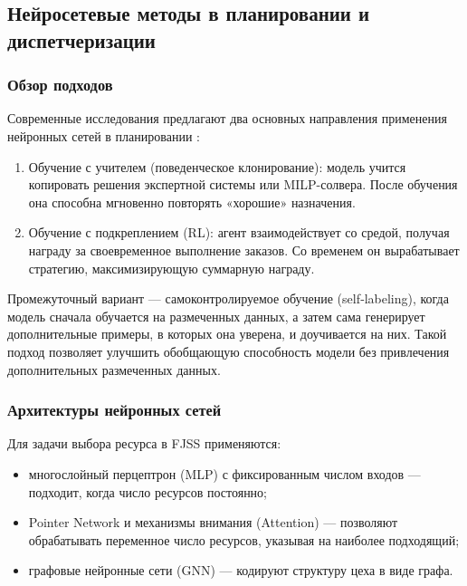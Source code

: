 \subsection{Нейросетевые методы в планировании и диспетчеризации}

\subsubsection{Обзор подходов}

Современные исследования предлагают два основных направления применения нейронных сетей в планировании \cite{gvoz}:

\begin{enumerate}
    \item Обучение с учителем (поведенческое клонирование): модель учится копировать решения экспертной системы или MILP-солвера. После обучения она способна мгновенно повторять «хорошие» назначения.
    \item Обучение с подкреплением (RL): агент взаимодействует со средой, получая награду за своевременное выполнение заказов. Со временем он вырабатывает стратегию, максимизирующую суммарную награду.
\end{enumerate}

Промежуточный вариант — самоконтролируемое обучение (self‑labeling), когда модель сначала обучается на размеченных данных, а затем сама генерирует дополнительные примеры, в которых она уверена, и доучивается на них. Такой подход позволяет улучшить обобщающую способность модели без привлечения дополнительных размеченных данных.

\subsubsection{Архитектуры нейронных сетей}

Для задачи выбора ресурса в FJSS применяются:

\begin{itemize}
    \item многослойный перцептрон (MLP) с фиксированным числом входов — подходит, когда число ресурсов постоянно;
    \item Pointer Network и механизмы внимания (Attention) — позволяют обрабатывать переменное число ресурсов, указывая на наиболее подходящий;
    \item графовые нейронные сети (GNN) — кодируют структуру цеха в виде графа.
\end{itemize}

